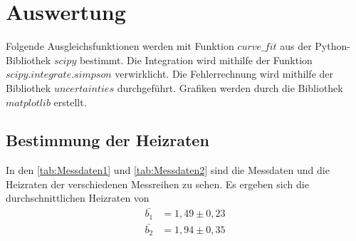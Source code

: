 \section{Auswertung}
\label{sec:auswertung}


Folgende Ausgleichsfunktionen werden mit Funktion $curve\_fit$ aus der Python\cite{py}-Bibliothek $scipy$\cite{2020SciPy-NMeth} bestimmt.
Die Integration wird mithilfe der Funktion $scipy.integrate.simpson$ \cite{2020SciPy-NMeth}verwirklicht.%
Die Fehlerrechnung wird mithilfe der Bibliothek $uncertainties$ \cite{unp} durchgeführt.
Grafiken werden durch die Bibliothek $matplotlib$\cite{Hunter:2007} erstellt. 

\subsection{Bestimmung der Heizraten}

In den \autoref{tab:Messdaten1} und \autoref{tab:Messdaten2} sind die Messdaten und die Heizraten der verschiedenen Messreihen zu sehen.
Es ergeben sich die durchschnittlichen Heizraten von 
\begin{align}
    \bar{b_1} &=   1,49 \pm  0,23 \label{eq:TheoH1} \\
    \bar{b_2} &=   1,94 \pm  0,35 \label{eq:TheoH2} 
\end{align}

